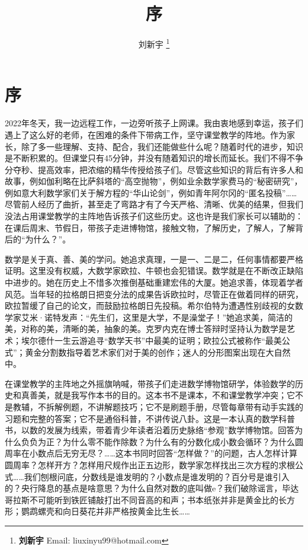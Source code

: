 \documentclass[b5paper]{ctexart}
\begin{document}
\title{序}

\author{刘新宇
\thanks{{\bfseries 刘新宇} \newline
  Email: liuxinyu99@hotmail.com \newline}
  }

\maketitle
\fi


\chapter*{序}

2022年冬天，我一边远程工作，一边旁听孩子上网课。我由衷地感到幸运，孩子们遇上了这么好的老师，在困难的条件下带病工作，坚守课堂教学的阵地。作为家长，除了多一些理解、支持、配合，我们还能做些什么呢？随着时代的进步，知识是不断积累的。但课堂只有45分钟，并没有随着知识的增长而延长。我们不得不争分夺秒、提高效率，把浓缩的精华传授给孩子们。尽管这些知识的背后有许多人和故事，例如伽利略在比萨斜塔的“高空抛物”，例如业余数学家费马的“秘密研究”，例如意大利数学家们关于解方程的“华山论剑”，例如青年阿尔冈的“匿名投稿”……尽管前人经历了曲折，甚至走了弯路才有了今天严格、清晰、优美的结果，但我们没法占用课堂教学的主阵地告诉孩子们这些历史。这也许是我们家长可以辅助的：在课后周末、节假日，带孩子走进博物馆，接触文物，了解历史，了解人，了解背后的“为什么？”。

数学是关于真、善、美的学问。她追求真理，一是一、二是二，任何事情都要严格证明。这里没有权威，大数学家欧拉、牛顿也会犯错误。数学就是在不断改正缺陷中进步的。她在历史上不惜多次推倒基础重建宏伟的大厦。她追求善，体现着学者风范。当年轻的拉格朗日把变分法的成果告诉欧拉时，尽管正在做着同样的研究，欧拉暂缓了自己的论文，而鼓励拉格朗日先投稿。希尔伯特为遭遇性别歧视的女数学家艾米·诺特发声：“先生们，这里是大学，不是澡堂子！”她追求美，简洁的美，对称的美，清晰的美，抽象的美。克罗内克在博士答辩时坚持认为数学是艺术；埃尔德什一生云游追寻“数学天书”中最美的证明；欧拉公式被称作“最美公式”；黄金分割数指导着艺术家们对于美的创作；迷人的分形图案出现在大自然中。

在课堂教学的主阵地之外摇旗呐喊，带孩子们走进数学博物馆研学，体验数学的历史和真善美，就是我写作本书的目的。这本书不是课本，不和课堂教学冲突；它不是教辅，不拆解例题，不讲解题技巧；它不是刷题手册，尽管每章带有动手实践的习题和完整的答案；它不是通俗科普，不讲传说八卦。这是一本认真的数学科普书，以数的发展为线索，带着青少年读者沿着历史脉络“参观”数学博物馆。回答为什么负负为正？为什么零不能作除数？为什么有的分数化成小数会循环？为什么圆周率在小数点后无穷无尽？……这本书同时回答“怎样做？”的问题，古人怎样计算圆周率？怎样开方？怎样用尺规作出正五边形，数学家怎样找出三次方程的求根公式……我们刨根问底，分数线是谁发明的？小数点是谁发明的？百分号是谁引入的？央行降息的基点是啥意思？为什么自然对数的底叫做e？我们破除谣言，毕达哥拉斯不可能听到铁匠铺敲打出不同音高的和声；书本纸张并非是黄金比的长方形；鹦鹉螺壳和向日葵花并非严格按黄金比生长……
\end{document}
